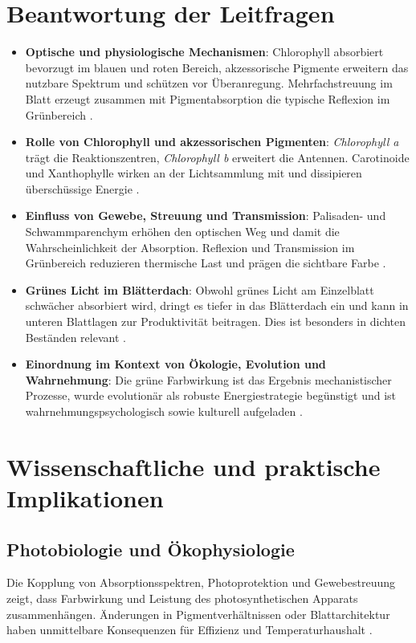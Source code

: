 \section{Beantwortung der Leitfragen}
\begin{itemize}
  \item \textbf{Optische und physiologische Mechanismen}: Chlorophyll absorbiert bevorzugt im blauen und roten Bereich, akzessorische Pigmente erweitern das nutzbare Spektrum und schützen vor Überanregung. Mehrfachstreuung im Blatt erzeugt zusammen mit Pigmentabsorption die typische Reflexion im Grünbereich \parencite{meyer2018photosynthese, gao2010lightabsorption}.
  \item \textbf{Rolle von Chlorophyll und akzessorischen Pigmenten}: \textit{Chlorophyll a} trägt die Reaktionszentren, \textit{Chlorophyll b} erweitert die Antennen. Carotinoide und Xanthophylle wirken an der Lichtsammlung mit und dissipieren überschüssige Energie \parencite{schmidt2015chlorophyll, gao2010lightabsorption}.
  \item \textbf{Einfluss von Gewebe, Streuung und Transmission}: Palisaden- und Schwammparenchym erhöhen den optischen Weg und damit die Wahrscheinlichkeit der Absorption. Reflexion und Transmission im Grünbereich reduzieren thermische Last und prägen die sichtbare Farbe \parencite{meyer2018photosynthese}.
  \item \textbf{Grünes Licht im Blätterdach}: Obwohl grünes Licht am Einzelblatt schwächer absorbiert wird, dringt es tiefer in das Blätterdach ein und kann in unteren Blattlagen zur Produktivität beitragen. Dies ist besonders in dichten Beständen relevant \parencite{zhao2012chlorophyll}.
  \item \textbf{Einordnung im Kontext von Ökologie, Evolution und Wahrnehmung}: Die grüne Farbwirkung ist das Ergebnis mechanistischer Prozesse, wurde evolutionär als robuste Energiestrategie begünstigt und ist wahrnehmungspsychologisch sowie kulturell aufgeladen \parencite{renoult2017evolution, weber2016farbpsychologie}.
\end{itemize}

\section{Wissenschaftliche und praktische Implikationen}
\subsection{Photobiologie und Ökophysiologie}
Die Kopplung von Absorptionsspektren, Photoprotektion und Gewebestreuung zeigt, dass Farbwirkung und Leistung des photosynthetischen Apparats zusammenhängen. Änderungen in Pigmentverhältnissen oder Blattarchitektur haben unmittelbare Konsequenzen für Effizienz und Temperaturhaushalt \parencite{schmidt2015chlorophyll, gao2010lightabsorption}.

